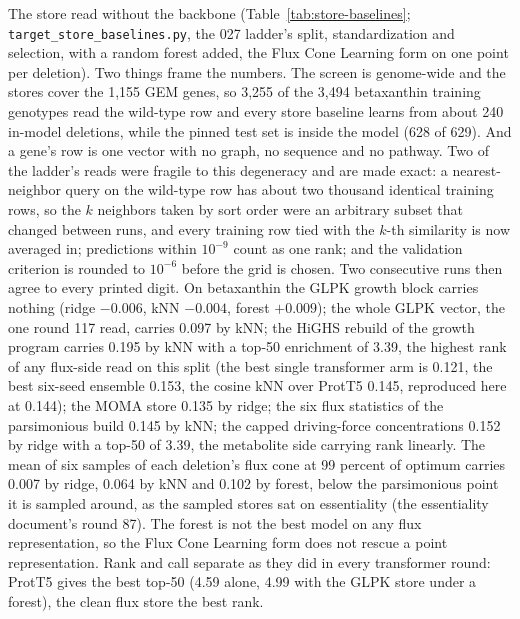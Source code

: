 The store read without the backbone (Table~\ref{tab:store-baselines};
\texttt{target\_store\_baselines.py}, the 027 ladder's split, standardization and
selection, with a random forest added, the Flux Cone Learning form on one point per
deletion). Two things frame the numbers. The screen is genome-wide and the stores cover
the 1,155 GEM genes, so 3,255 of the 3,494 betaxanthin training genotypes read the
wild-type row and every store baseline learns from about 240 in-model deletions, while
the pinned test set is inside the model (628 of 629). And a gene's row is one vector
with no graph, no sequence and no pathway. Two of the ladder's reads were fragile to
this degeneracy and are made exact: a nearest-neighbor query on the wild-type row has
about two thousand identical training rows, so the $k$ neighbors taken by sort order
were an arbitrary subset that changed between runs, and every training row tied with
the $k$-th similarity is now averaged in; predictions within $10^{-9}$ count as one
rank; and the validation criterion is rounded to $10^{-6}$ before the grid is chosen.
Two consecutive runs then agree to every printed digit. On betaxanthin the GLPK growth
block carries nothing (ridge $-0.006$, kNN $-0.004$, forest $+0.009$); the whole GLPK
vector, the one round 117 read, carries 0.097 by kNN; the HiGHS rebuild of the growth
program carries 0.195 by kNN with a top-50 enrichment of 3.39, the highest rank of any
flux-side read on this split (the best single transformer arm is 0.121, the best six-seed
ensemble 0.153, the cosine kNN over ProtT5 0.145, reproduced here at 0.144); the MOMA
store 0.135 by ridge; the six flux statistics of the parsimonious build 0.145 by kNN;
the capped driving-force concentrations 0.152 by
ridge with a top-50 of 3.39, the metabolite side carrying rank linearly. The mean of
six samples of each deletion's flux cone at 99 percent of optimum carries 0.007 by
ridge, 0.064 by kNN and 0.102 by forest, below the parsimonious point it is sampled
around, as the sampled stores sat on essentiality (the essentiality document's round 87). The forest is not the
best model on any flux representation, so the Flux Cone Learning form does not rescue a
point representation. Rank and call separate as they did in every transformer round:
ProtT5 gives the best top-50 (4.59 alone, 4.99 with the GLPK store under a forest), the
clean flux store the best rank.

